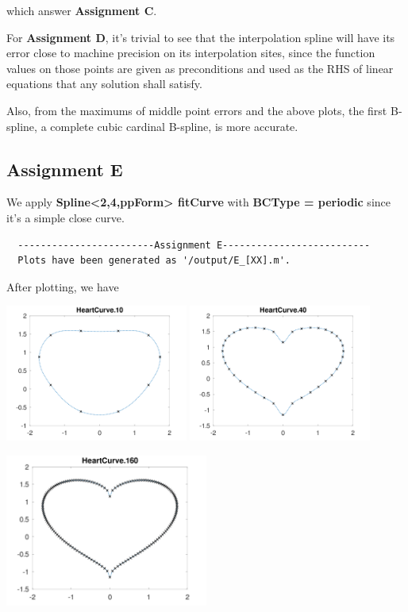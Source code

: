 \documentclass{article}
\begin{document}
which answer \textbf{Assignment C}.

For \textbf{Assignment D}, it's trivial to see that the interpolation spline will have 
its error close to machine precision on its interpolation sites, since the function values 
on those points are given as preconditions and used as the RHS of linear equations that any 
solution shall satisfy. 

Also, from the maximums of middle point errors and the above plots, the first B-spline, a complete cubic 
cardinal B-spline, is more accurate.

\subsection{\textbf{Assignment E}}
\lstset{language=C++}
We apply \textbf{Spline<2,4,ppForm> fitCurve} with \textbf{BCType = periodic} since it's 
a simple close curve. 
\begin{lstlisting}
  ------------------------Assignment E--------------------------
  Plots have been generated as '/output/E_[XX].m'.
\end{lstlisting}
After plotting, we have

\includegraphics[width=0.45\textwidth]{figures/Assignment_E_10.png}
\includegraphics[width=0.45\textwidth]{figures/Assignment_E_40.png}

\includegraphics[width=0.5\textwidth]{figures/Assignment_E_160.png}
\end{document}
